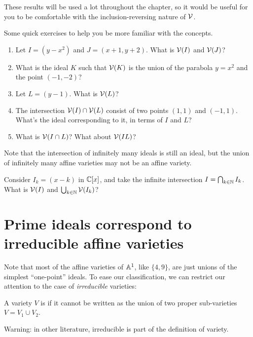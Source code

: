 These results will be used a lot throughout the chapter, so it would be useful
for you to be comfortable with the inclusion-reversing nature of $\mathcal V$.
\begin{exercise}
	Some quick exercises to help you be more familiar with the concepts.
	\begin{enumerate}
		\item Let $I=(y-x^2)$ and $J=(x+1, y+2)$. What is $\mathcal V(I)$ and $\mathcal V(J)$?
		\item What is the ideal $K$ such that $\mathcal V(K)$ is the union of the
			parabola $y=x^2$ and the point $(-1, -2)$?
		\item Let $L=(y-1)$. What is $\mathcal V(L)$?
		\item The intersection $\mathcal V(I) \cap \mathcal V(L)$ consist of two points $(1,
			1)$ and $(-1, 1)$. What's the ideal corresponding to it, in terms of
			$I$ and $L$?
		\item What is $\mathcal V(I \cap L)$? What about $\mathcal V(I L)$?
	\end{enumerate}
\end{exercise}

\begin{ques}
Note that the intersection of infinitely many ideals is still an ideal, but the
union of infinitely many affine varieties may not be an affine variety.

Consider $I_k = (x-k)$ in $\mathbb C[x]$, and take the infinite intersection
$I = \bigcap_{k \in \mathbb N} I_k$. What is $\mathcal V(I)$ and $\bigcup_{k \in \mathbb N}
\mathcal V(I_k)$?
\end{ques}

\section{Prime ideals correspond to irreducible affine varieties}

Note that most of the affine varieties of $\mathbb A^1$, like $\{4,9\}$,
are just unions of the simplest ``one-point'' ideals.
To ease our classification,
we can restrict our attention to the case of \emph{irreducible} varieties:
\begin{definition}
	A variety $V$ is  if it cannot be written
	as the union of two proper sub-varieties $V = V_1 \cup V_2$.
\end{definition}
\begin{abuse}
	Warning: in other literature,
	irreducible is part of the definition of variety.
\end{abuse}

